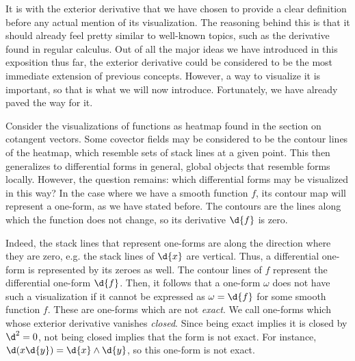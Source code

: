 \documentclass[a4paper,12pt]{article}
\begin{document}
It is with the exterior derivative that we have chosen to provide a clear definition before any actual mention of its visualization.
The reasoning behind this is that it should already feel pretty similar to well-known topics, such as the derivative found in regular calculus.
Out of all the major ideas we have introduced in this exposition thus far, the exterior derivative could be considered to be the most immediate extension of previous concepts.
However, a way to visualize it is important, so that is what we will now introduce.
Fortunately, we have already paved the way for it.

Consider the visualizations of functions as heatmap found in the section on cotangent vectors.
Some covector fields may be considered to be the contour lines of the heatmap, which resemble sets of stack lines at a given point.
This then generalizes to differential forms in general, global objects that resemble forms locally.
However, the question remains: which differential forms may be visualized in this way?
In the case where we have a smooth function $f$, its contour map will represent a one-form, as we have stated before.
The contours are the lines along which the function does not change, so its derivative $\d{f}$ is zero.

Indeed, the stack lines that represent one-forms are along the direction where they are zero, e.g. the stack lines of $\d{x}$ are vertical.
Thus, a differential one-form is represented by its zeroes as well.
The contour lines of $f$ represent the differential one-form $\d{f}$.
Then, it follows that a one-form $\omega$ does not have such a visualization if it cannot be expressed as $\omega = \d{f}$ for some smooth function $f$.
These are one-forms which are not \emph{exact}.
We call one-forms which whose exterior derivative vanishes \emph{closed}.
Since being exact implies it is closed by $\d^2 = 0$, not being closed implies that the form is not exact.
For instance, $\d(x\d{y}) = \d{x} \wedge \d{y}$, so this one-form is not exact.
\end{document}
